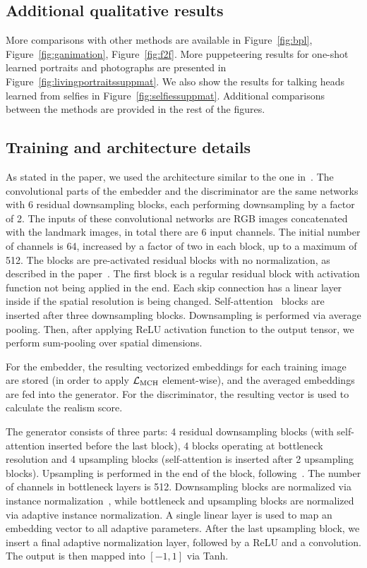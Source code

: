 \documentclass[10pt,twocolumn,letterpaper]{article}
\newcommand{\fig}[1]{Figure~\ref{fig:#1}}
\begin{document}
\subsection{Additional qualitative results}

More comparisons with other methods are available in \fig{bpl}, \fig{ganimation}, \fig{f2f}. More puppeteering results for one-shot learned portraits and photographs are presented in \fig{livingportraitssuppmat}. We also show the results for talking heads learned from selfies in \fig{selfiessuppmat}. Additional comparisons between the methods are provided in the rest of the figures.

\subsection{Training and architecture details}

As stated in the paper, we used the architecture similar to the one in~\cite{Brock18}. The convolutional parts of the embedder and the discriminator are the same networks with 6 residual downsampling blocks, each performing downsampling by a factor of 2. The inputs of these convolutional networks are RGB images concatenated with the landmark images, in total there are 6 input channels. The initial number of channels is 64, increased by a factor of two in each block, up to a maximum of 512. The blocks are pre-activated residual blocks with no normalization, as described in the paper~\cite{Brock18}. The first block is a regular residual block with activation function not being applied in the end. Each skip connection has a linear layer inside if the spatial resolution is being changed. Self-attention~\cite{Zhang18b} blocks are inserted after three downsampling blocks. Downsampling is performed via average pooling. Then, after applying ReLU activation function to the output tensor, we perform sum-pooling over spatial dimensions.

For the embedder, the resulting vectorized embeddings for each training image are stored (in order to apply $\mathcal{L}_\text{MCH}$ element-wise), and the averaged embeddings are fed into the generator. For the discriminator, the resulting vector is used to calculate the realism score.

The generator consists of three parts: 4 residual downsampling blocks (with self-attention inserted before the last block), 4 blocks operating at bottleneck resolution and 4 upsampling blocks (self-attention is inserted after 2 upsampling blocks). Upsampling is performed in the end of the block, following~\cite{Brock18}. The number of channels in bottleneck layers is 512. Downsampling blocks are normalized via instance normalization~\cite{Ulyanov16}, while bottleneck and upsampling blocks are normalized via adaptive instance normalization. A single linear layer is used to map an embedding vector to all adaptive parameters. After the last upsampling block, we insert a final adaptive normalization layer, followed by a ReLU and a convolution. The output is then mapped into $[-1, 1]$ via Tanh.
\end{document}
